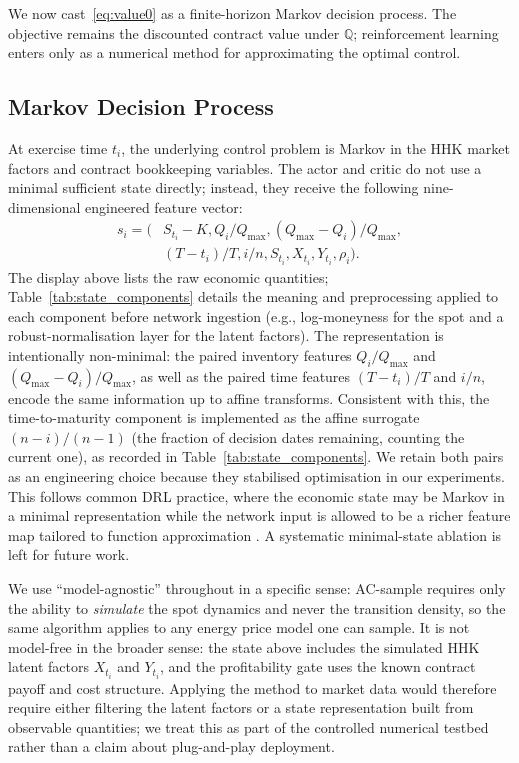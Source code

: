 \documentclass[a4paper,fleqn]{cas-dc}
\begin{document}
We now cast~\eqref{eq:value0} as a finite-horizon Markov decision process. The objective remains the discounted contract value under $\mathbb{Q}$; reinforcement learning enters only as a numerical method for approximating the optimal control.

\subsection{Markov Decision Process}
\label{sec:mdp}

At exercise time $t_i$, the underlying control problem is Markov in the HHK market factors and contract bookkeeping variables. The actor and critic do not use a minimal sufficient state directly; instead, they receive the following nine-dimensional engineered feature vector:
\[
    \begin{aligned}
        s_i = \bigl( & S_{t_i} - K,
        Q_i / Q_{\max},
        (Q_{\max} - Q_i) / Q_{\max}, \\
                     & (T - t_i)/T,
        i/n,
        S_{t_i},
        X_{t_i},
        Y_{t_i},
        \rho_i\bigr).
    \end{aligned}
\]
The display above lists the raw economic quantities; Table~\ref{tab:state_components} details the meaning and preprocessing applied to each component before network ingestion (e.g., log-moneyness for the spot and a robust-normalisation layer for the latent factors). The representation is intentionally non-minimal: the paired inventory features $Q_i/Q_{\max}$ and $(Q_{\max}-Q_i)/Q_{\max}$, as well as the paired time features $(T-t_i)/T$ and $i/n$, encode the same information up to affine transforms. Consistent with this, the time-to-maturity component is implemented as the affine surrogate $(n-i)/(n-1)$ (the fraction of decision dates remaining, counting the current one), as recorded in Table~\ref{tab:state_components}. We retain both pairs as an engineering choice because they stabilised optimisation in our experiments. This follows common DRL practice, where the economic state may be Markov in a minimal representation while the network input is allowed to be a richer feature map tailored to function approximation \cite{kolm2019dynamic,pickard2023review,cao2022gamma}. A systematic minimal-state ablation is left for future work.

We use ``model-agnostic'' throughout in a specific sense: AC-sample requires only the ability to \emph{simulate} the spot dynamics and never the transition density, so the same algorithm applies to any energy price model one can sample. It is not model-free in the broader sense: the state above includes the simulated HHK latent factors $X_{t_i}$ and $Y_{t_i}$, and the profitability gate uses the known contract payoff and cost structure. Applying the method to market data would therefore require either filtering the latent factors or a state representation built from observable quantities; we treat this as part of the controlled numerical testbed rather than a claim about plug-and-play deployment.
\end{document}
